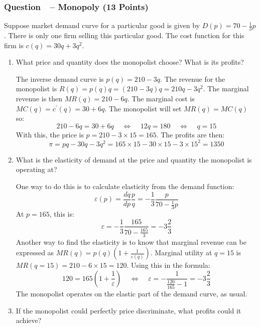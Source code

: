 \documentclass[12pt]{article}
\newcounter{question}[section]
\newcommand{\question}[1]{\refstepcounter{question}
  \subsubsection*{Question~\thequestion~-- #1}}
\newenvironment{subquestions}{
  \begin{enumerate}[label=(\roman*)]}{\end{enumerate}}
\begin{document}
\question{Monopoly (13 Points)}
Suppose market demand curve for a particular good is given by $D\left( p
\right)=70-\frac{1}{3}p$. There is only one firm selling this particular good.
The cost function for this firm is $c\left( q \right)=30q+3q^2$.
\begin{subquestions}
  \item What price and quantity does the monopolist choose? What is its profits?

    \textcolor{solution-color}{
      The inverse demand curve is $p\left( q \right)=210-3q$. The revenue for
      the monopolist is $R\left( q \right)=p\left( q \right)q=\left( 210-3q
      \right)q=210q-3q^2$. The marginal revenue is then $MR\left( q
    \right)=210-6q$.
    The marginal cost is $MC\left( q \right)=c^\prime\left( q \right)=30+6q$.
    The monopolist will set $MR\left( q \right)=MC\left( q \right)$ so:
    \[
      210-6q=30+6q \;\;\;\;\Longleftrightarrow \;\;\;\;12q=180
      \;\;\;\;\Longleftrightarrow \;\;\;\; q = 15
    \]
    With this, the price is $p=210-3\times 15=165$. The profits are then:
    \[
      \pi=pq-30q-3q^2 = 165\times 15 - 30\times 15 - 3\times 15^2 =1350
    \]
    }
  \item What is the elasticity of demand at the price and quantity the
    monopolist is operating at?

    \textcolor{solution-color}{
      One way to do this is to calculate elasticity from the demand function:
      \[
        \varepsilon\left( p \right)=\frac{dq}{dp}\frac{p}{q}=-\frac{1}{3}\frac{p}{70-\frac{1}{3}p}
      \]
      At $p=165$, this is:
      \[
        \varepsilon =
        -\frac{1}{3}\frac{165}{70-\frac{165}{3}}=-3\frac{2}{3}
      \]
      Another way to find the elasticity is to know that marginal revenue can
      be expressed as $MR\left( q \right)=p\left( q \right)\left( 1+\frac{1}{
      \varepsilon\left( q \right)} \right)$. Marginal utility at $q=15$
      is $MR\left( q=15 \right)=210 - 6\times 15 = 120$. Using this in the
      formula:
      \[
        120=165\left( 1+\frac{1}{  \varepsilon} \right)
        \;\;\;\;\Longleftrightarrow \;\;\;\;  \varepsilon
        =-\frac{1}{\frac{120}{165}-1}=-3\frac{2}{3}
      \]
      The monopolist operates on the elastic part of the demand curve, as
      usual.
    }
  \item If the monopolist could perfectly price discriminate, what profits
    could it achieve?


\end{subquestions}
\end{document}
